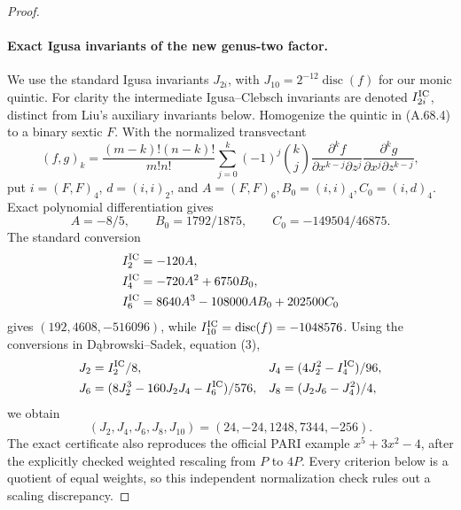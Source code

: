 \begin{proof}
\paragraph{Exact Igusa invariants of the new genus-two factor.}
We use the standard Igusa invariants \(J_{2i}\), with
\(J_{10}=2^{-12}\operatorname{disc}(f)\) for our monic quintic.
For clarity the intermediate Igusa--Clebsch invariants are denoted
\(I^{\rm IC}_{2i}\), distinct from Liu's auxiliary invariants below.
Homogenize the quintic in (A.68.4) to a binary sextic \(F\).
With the normalized transvectant
\[
 (f,g)_k=\frac{(m-k)!(n-k)!}{m!n!}
 \sum_{j=0}^k(-1)^j\binom{k}{j}
 \frac{\partial^kf}{\partial x^{k-j}\partial z^j}
 \frac{\partial^kg}{\partial x^j\partial z^{k-j}},
                                                               \tag{A.68.7}
\]
put \(i=(F,F)_4\), \(d=(i,i)_2\), and
\(A=(F,F)_6,B_0=(i,i)_4,C_0=(i,d)_4\). Exact polynomial
differentiation gives
\[
 A=-8/5,\qquad B_0=1792/1875,\qquad C_0=-149504/46875.
\]
The standard conversion
\[
 \begin{split}
 I^{\rm IC}_2&=-120A,\\
 I^{\rm IC}_4&=-720A^2+6750B_0,\\
 I^{\rm IC}_6&=8640A^3-108000AB_0+202500C_0
 \end{split}
\]
gives \((192,4608,-516096)\), while
\(I^{\rm IC}_{10}=\operatorname{disc}(f)=-1048576\).
Using the conversions in D\k{a}browski--Sadek, equation (3),
\[
 \begin{aligned}
 J_2&=I^{\rm IC}_2/8,&
 J_4&=(4J_2^2-I^{\rm IC}_4)/96,\\
 J_6&=(8J_2^3-160J_2J_4-I^{\rm IC}_6)/576,&
 J_8&=(J_2J_6-J_4^2)/4,
 \end{aligned}
\]
we obtain
\[
                 (J_2,J_4,J_6,J_8,J_{10})
                    =(24,-24,1248,7344,-256).                 \tag{A.68.8}
\]
The exact certificate also reproduces the official PARI example
\(x^5+3x^2-4\), after the explicitly checked weighted rescaling from \(P\) to \(4P\).
Every criterion below is a quotient of equal weights, so this
independent normalization check rules out a scaling discrepancy.


\end{proof}
